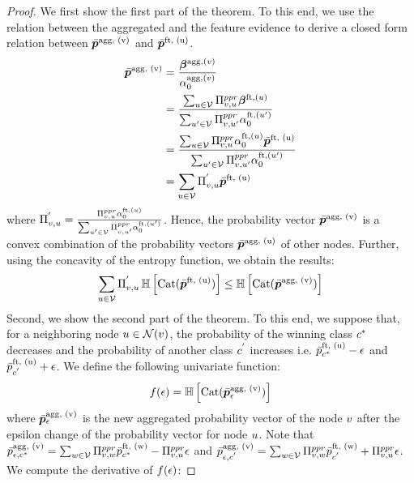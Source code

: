 \begin{proof}
We first show the first part of the theorem. To this end, we use the relation between the aggregated and the feature evidence to derive a closed form relation between $\bar{\bm{p}}^\text{agg, (v)}$ and $\bar{\bm{p}}^\text{ft, (u)}$.
\begin{align*}
    \bar{\bm{p}}^\text{agg, (v)} & = \frac{\bm{\beta}^{\text{agg}, (v)}}{\alpha_0^{\text{agg}, (v)}} \\
    & = \frac{\sum_{u \in \mathcal{V}} \Pi^{ppr}_{v, u} \bm{\beta}^{\text{ft}, (u)}}{\sum_{u' \in \mathcal{V}} \Pi^{ppr}_{v, u'} \alpha_0^{\text{ft}, (u')}}\\ 
    & = \frac{\sum_{u \in \mathcal{V}} \Pi^{ppr}_{v, u} \alpha_0^{\text{ft}, (u)} \bar{\bm{p}}^\text{ft, (u)}}{\sum_{u' \in \mathcal{V}} \Pi^{ppr}_{v, u'} \alpha_0^{\text{ft}, (u')}}\\
    & = \sum_{u \in \mathcal{V}} \Pi_{v, u}^{'} \bar{\bm{p}}^\text{ft, (u)}
\end{align*}
where $\Pi_{v, u}^{'} =  \frac{\Pi^{ppr}_{v, u} \alpha_0^{\text{ft}, (u)} }{\sum_{u' \in \mathcal{V}} \Pi^{ppr}_{v, u'} \alpha_0^{\text{ft}, (u')}}$. Hence, the probability vector $\bar{\bm{p}}^\text{agg, (v)}$ is a convex combination of the probability vectors $\bar{\bm{p}}^\text{agg, (u)}$ of other nodes. Further, using the concavity of the entropy function, we obtain the results:
\begin{align*}
    \sum_{u \in \mathcal{V}} \Pi_{v, u}^{'} \operatorname{\mathbb{H}}\left[\operatorname{Cat}(\bar{\bm{p}}^\text{ft, (u)})\right] \leq \operatorname{\mathbb{H}}\left[\operatorname{Cat}(\bar{\bm{p}}^\text{agg, (v)})\right]
\end{align*}
Second, we show the second part of the theorem. To this end, we suppose that, for a neighboring node $u \in \mathcal{N}(v)$, the probability of the winning class $c^*$ decreases and the probability of another class $c^{'}$ increases i.e. $\bar{p}_{c^*}^\text{ft, (u)} - {\epsilon}$ and $\bar{p}_{c^{'}}^\text{ft, (u)} + {\epsilon}$. We define the following univariate function:
\begin{align*}
    f({\epsilon}) = \operatorname{\mathbb{H}}\left[\operatorname{Cat}(\bar{\bm{p}}_{{\epsilon}}^\text{agg, (v)})\right]
\end{align*}
where $\bar{\bm{p}}_{{\epsilon}}^\text{agg, (v)}$ is the new aggregated probability vector of the node $v$ after the epsilon change of the probability vector for node $u$. Note that $\bar{p}_{{\epsilon}, c^*}^\text{agg, (v)} = \sum_{w \in \mathcal{V}} \Pi^{ppr}_{v, w} \bar{p}_{c^*}^\text{ft, (w)} - \Pi^{ppr}_{v, u}{\epsilon}$ and $\bar{p}_{{\epsilon}, c^{'}}^\text{agg, (v)} = \sum_{w \in \mathcal{V}} \Pi^{ppr}_{v, w} \bar{p}_{c^{'}}^\text{ft, (w)} + \Pi^{ppr}_{v, u}{\epsilon}$. We compute the derivative of $f({\epsilon})$:

\end{proof}
